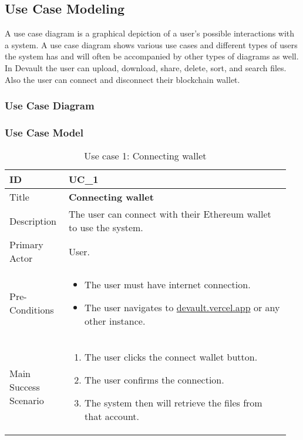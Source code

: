 
\newpage
\subsection{Use Case Modeling}

A use case diagram is a graphical depiction of a user's possible interactions with a system. A use case diagram shows various use cases and different types of users the system has and will often be accompanied by other types of diagrams as well.
In Devault the user can upload, download, share, delete, sort, and search files. Also the user can connect and disconnect their blockchain wallet.

\subsubsection{Use Case Diagram}



\subsubsection{Use Case Model}

\begin{longtable}{p{0.20\linewidth} | p{0.75\linewidth}}
  \caption{Use case 1: Connecting wallet}
  \label{tab:useCaseConnect}
  \\\toprule
  ID & UC\_1
  \\\midrule
  Title & \textbf{Connecting wallet}
  \\\hline
  Description & The user can connect with their Ethereum wallet to use the system.
  \\\hline
  Primary Actor & User.
  \\\hline
  Pre-Conditions & {
    \begin{itemize}
    \item The user must have internet connection.
    \item The user navigates to \url{devault.vercel.app} or any other instance.
    \end{itemize}
  }\vspace*{-\baselineskip}
  \\\hline
  Main Success Scenario & {
    \begin{enumerate}
    \item The user clicks the connect wallet button.
    \item The user confirms the connection.
    \item The system then will retrieve the files from that account.
    \end{enumerate}
  }\vspace*{-\baselineskip}
  \\\bottomrule
\end{longtable}

